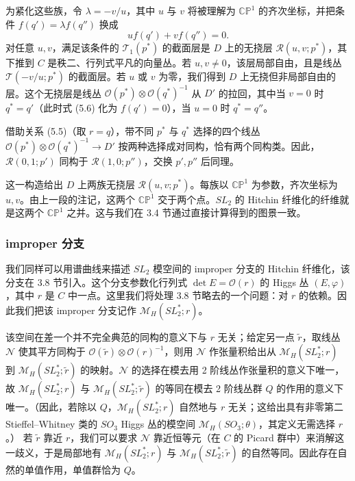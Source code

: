 为紧化这些族，令 $\lambda = -v/u$，其中 $u$ 与 $v$ 将被理解为 $\mathbb{CP}^1$ 的齐次坐标，并把条件 $f(q')=\lambda f(q'')$ 换成
\begin{equation}\tag{5.6}
u f(q') + v f(q'') = 0.
\end{equation}
对任意 $u,v$，满足该条件的 $\mathcal{T}_1(p^*)$ 的截面层是 $D$ 上的无挠层 $\mathcal{R}(u,v;p^*)$，其下推到 $C$ 是秩二、行列式平凡的向量丛。若 $u,v\neq 0$，该层局部自由，且是线丛 $\mathcal{T}(-v/u;p^*)$ 的截面层。若 $u$ 或 $v$ 为零，我们得到 $D$ 上无挠但非局部自由的层。这个无挠层是线丛 $\mathcal{O}(p^*)\otimes\mathcal{O}(q^*)^{-1}$ 从 $D'$ 的拉回，其中当 $v=0$ 时 $q^*=q'$（此时式 (5.6) 化为 $f(q')=0$），当 $u=0$ 时 $q^*=q''$。

借助关系 (5.5)（取 $r=q$），带不同 $p^*$ 与 $q^*$ 选择的四个线丛 $\mathcal{O}(p^*)\otimes\mathcal{O}(q^*)^{-1}\to D'$ 按两种选择成对同构，恰有两个同构类。因此，$\mathcal{R}(0,1;p')$ 同构于 $\mathcal{R}(1,0;p'')$，交换 $p',p''$ 后同理。

这一构造给出 $D$ 上两族无挠层 $\mathcal{R}(u,v;p^*)$。每族以 $\mathbb{CP}^1$ 为参数，齐次坐标为 $u,v$。由上一段的注记，这两个 $\mathbb{CP}^1$ 交于两个点。$SL_2$ 的 Hitchin 纤维化的纤维就是这两个 $\mathbb{CP}^1$ 之并。这与我们在 3.4 节通过直接计算得到的图景一致。

\subsubsection{improper 分支}

我们同样可以用谱曲线来描述 $SL_2$ 模空间的 improper 分支的 Hitchin 纤维化，该分支在 3.8 节引入。这个分支参数化行列式 $\det E = \mathcal{O}(r)$ 的 Higgs 丛 $(E,\varphi)$，其中 $r$ 是 $C$ 中一点。这里我们将处理 3.8 节略去的一个问题：对 $r$ 的依赖。因此我们把该 improper 分支记作 $\mathcal{M}_H(SL_2^*;r)$。

该空间在差一个并不完全典范的同构的意义下与 $r$ 无关；给定另一点 $\tilde{r}$，取线丛 $\mathcal{N}$ 使其平方同构于 $\mathcal{O}(\tilde{r})\otimes\mathcal{O}(r)^{-1}$，则用 $\mathcal{N}$ 作张量积给出从 $\mathcal{M}_H(SL_2^*;r)$ 到 $\mathcal{M}_H(SL_2^*;\tilde{r})$ 的映射。$\mathcal{N}$ 的选择在模去用 2 阶线丛作张量积的意义下唯一，故 $\mathcal{M}_H(SL_2^*;r)$ 与 $\mathcal{M}_H(SL_2^*;\tilde{r})$ 的等同在模去 2 阶线丛群 $Q$ 的作用的意义下唯一。（因此，若除以 $Q$，$\mathcal{M}_H(SL_2^*;r)$ 自然地与 $r$ 无关；这给出具有非零第二 Stieffel--Whitney 类的 $SO_3$ Higgs 丛的模空间 $\mathcal{M}_H(SO_3;\theta)$，其定义无需选择 $r$。）
若 $\tilde{r}$ 靠近 $r$，我们可以要求 $\mathcal{N}$ 靠近恒等元（在 $C$ 的 Picard 群中）来消解这一歧义，于是局部地有 $\mathcal{M}_H(SL_2^*;r)$ 与 $\mathcal{M}_H(SL_2^*;\tilde{r})$ 的自然等同。因此存在自然的单值作用，单值群恰为 $Q$。

